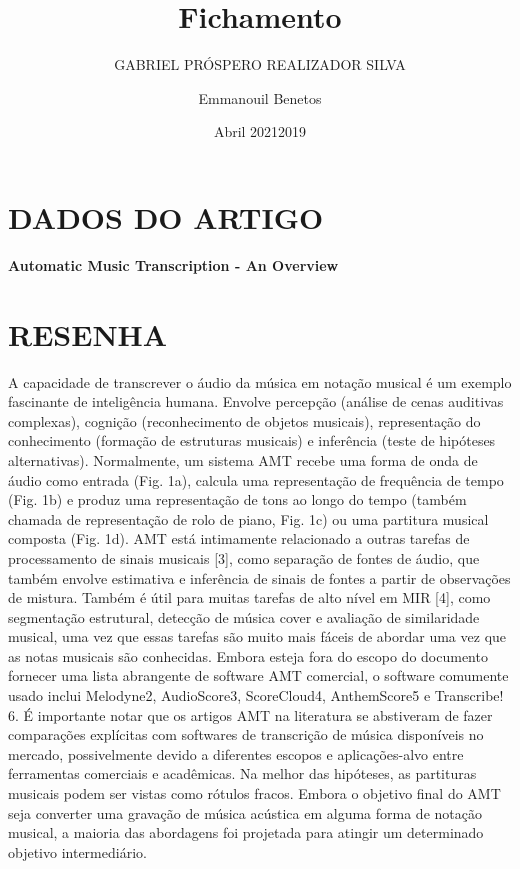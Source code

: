 \documentclass{article}
\title{Fichamento}
\author{GABRIEL PRÓSPERO REALIZADOR  SILVA}
\date{Abril 2021}
\begin{document}
\maketitle

\section{DADOS DO ARTIGO}
\textbf{Automatic Music Transcription - An Overview \\}
\author{Emmanouil Benetos\\}
\date{2019}

\section{RESENHA}
A capacidade de transcrever o áudio da música em notação musical é um exemplo fascinante de inteligência humana. Envolve percepção (análise de cenas auditivas complexas), cognição (reconhecimento de objetos musicais), representação do conhecimento (formação de estruturas musicais) e inferência (teste de hipóteses alternativas).
Normalmente, um sistema AMT recebe uma forma de onda de áudio como entrada (Fig. 1a), calcula uma representação de frequência de tempo (Fig. 1b) e produz uma representação de tons ao longo do tempo (também chamada de representação de rolo de piano, Fig. 1c) ou uma partitura musical composta (Fig. 1d).
AMT está intimamente relacionado a outras tarefas de processamento de sinais musicais [3], como separação de fontes de áudio, que também envolve estimativa e inferência de sinais de fontes a partir de observações de mistura. Também é útil para muitas tarefas de alto nível em MIR [4], como segmentação estrutural, detecção de música cover e avaliação de similaridade musical, uma vez que essas tarefas são muito mais fáceis de abordar uma vez que as notas musicais são conhecidas.
Embora esteja fora do escopo do documento fornecer uma lista abrangente de software AMT comercial, o software comumente usado inclui Melodyne2, AudioScore3, ScoreCloud4, AnthemScore5 e Transcribe! 6. É importante notar que os artigos AMT na literatura se abstiveram de fazer comparações explícitas com softwares de transcrição de música disponíveis no mercado, possivelmente devido a diferentes escopos e aplicações-alvo entre ferramentas comerciais e acadêmicas.
Na melhor das hipóteses, as partituras musicais podem ser vistas como rótulos fracos.
Embora o objetivo final do AMT seja converter uma gravação de música acústica em alguma forma de notação musical, a maioria das abordagens foi projetada para atingir um determinado objetivo intermediário.
\end{document}
